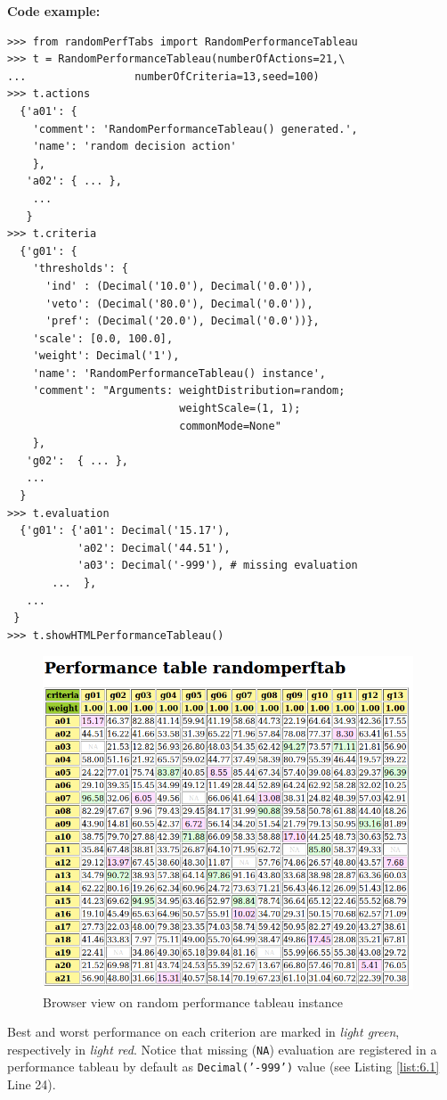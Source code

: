 \noindent \textbf{Code example:}
\begin{lstlisting}[caption={Generating a random performance tableau},label=list:6.1]
>>> from randomPerfTabs import RandomPerformanceTableau
>>> t = RandomPerformanceTableau(numberOfActions=21,\
...                 numberOfCriteria=13,seed=100)
>>> t.actions
  {'a01': {
    'comment': 'RandomPerformanceTableau() generated.',
    'name': 'random decision action'
    },
   'a02': { ... },
    ...
   }
>>> t.criteria
  {'g01': {
    'thresholds': {
      'ind' : (Decimal('10.0'), Decimal('0.0')),
      'veto': (Decimal('80.0'), Decimal('0.0')),
      'pref': (Decimal('20.0'), Decimal('0.0'))},
    'scale': [0.0, 100.0],
    'weight': Decimal('1'),
    'name': 'RandomPerformanceTableau() instance',
    'comment': "Arguments: weightDistribution=random;
                           weightScale=(1, 1);
                           commonMode=None"
    },
   'g02':  { ... },
   ...
  }
>>> t.evaluation
  {'g01': {'a01': Decimal('15.17'),
           'a02': Decimal('44.51'),
           'a03': Decimal('-999'), # missing evaluation
       ...  },
   ...
 }
>>> t.showHTMLPerformanceTableau()
\end{lstlisting}
\begin{figure}[h]
\includegraphics[width=11cm]{Figures/randomPerfTab1.png}
\caption{Browser view on random performance tableau instance}
\label{fig:6.1}       %
\end{figure}
Best and worst performance on each criterion are marked in \emph{light green}, respectively in \emph{light red}. Notice that missing (\texttt{NA}) evaluation are registered in a performance tableau by default as \texttt{Decimal('-999')} value (see Listing \ref{list:6.1} Line 24).	    
